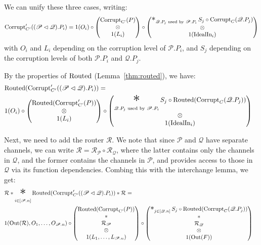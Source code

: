 \begin{theorem}
We can unify these three cases, writing:
$$
\tx{Corrupt}'_{C'}((\mathscr{P} \lhd \mathscr{Q}).P_i) =
1(O_i) \circ
\begin{pmatrix}
  \tx{Corrupt}_{\tx{C'}}(P)\cr
  \otimes\cr
  1(L_i)
\end{pmatrix}
\circ
\begin{pmatrix}
\bigast_{\mathscr{Q}.P_j \tx{ used by } \mathscr{P}.P_i}
  S_j \circ \tx{Corrupt}_C(\mathscr{Q}.P_j)\cr
  \otimes\cr
1(\tx{IdealIn}_i)
\end{pmatrix}
$$
with $O_i$ and $L_i$ depending on the corruption level of $\mathscr{P}.P_i$,
and $S_j$ depending on the corruption levels of both $\mathscr{P}.P_i$
and $\mathscr{Q}.P_j$.

By the properties of $\text{Routed}$ (Lemma~\ref{thm:routed}), we have:
$$
\begin{aligned}
&\tx{Routed}(\tx{Corrupt}'_{C'}((\mathscr{P} \lhd \mathscr{Q}).P_i)) =\cr
&1(O_i) \circ
\begin{pmatrix}
  \tx{Routed}(\tx{Corrupt}'_{\tx{C'}}(P))\cr
  \otimes\cr
  1(L_i)
\end{pmatrix}
\circ
\begin{pmatrix}
\displaystyle\bigast_{\mathscr{Q}.P_j \tx{ used by } \mathscr{P}.P_i}
  S_j \circ \tx{Routed}(\tx{Corrupt}_C(\mathscr{Q}.P_j))\cr
  \otimes\cr
1(\tx{IdealIn}_i)
\end{pmatrix}
\end{aligned}
$$

Next, we need to add the router $\mathcal{R}$.
We note that since $\mathscr{P}$ and $\mathscr{Q}$ have separate channels,
we can write $\mathcal{R} = \mathcal{R}_{\mathscr{P}} \circ \mathcal{R}_{\mathscr{Q}}$,
where the latter contains only the channels in $\mathscr{Q}$,
and the former contains the channels in $\mathscr{P}$,
and provides access to those in $\mathscr{Q}$ via its function dependencies.
Combing this with the interchange lemma, we get:
$$
\begin{aligned}
&\mathcal{R} * \bigast_{i \in [\mathscr{P}.n]}\tx{Routed}(\tx{Corrupt}'_{C'}((\mathscr{P} \lhd \mathscr{Q}).P_i)) * \mathcal{R} =\cr
&1(\tx{Out}(\mathcal{R}), O_1, \ldots, O_{\mathscr{P}.n}) \circ
\begin{pmatrix}
  \tx{Routed}(\tx{Corrupt}_{\tx{C'}}(P))\cr
  *\cr
  \mathcal{R}_{\mathscr{P}}\cr
  \otimes\cr
  1(L_1, \ldots, L_{\mathscr{P}.n})
\end{pmatrix}
\circ
\begin{pmatrix}
\bigast_{j \in [\mathscr{Q}.n]}
  S_j \circ \tx{Routed}(\tx{Corrupt}_C(\mathscr{Q}.P_j))
  \cr
  *\cr
  \mathcal{R}_{\mathscr{Q}}\cr
  \otimes\cr
  1(\tx{Out}(F))
\end{pmatrix}
\end{aligned}
$$


\end{theorem}
